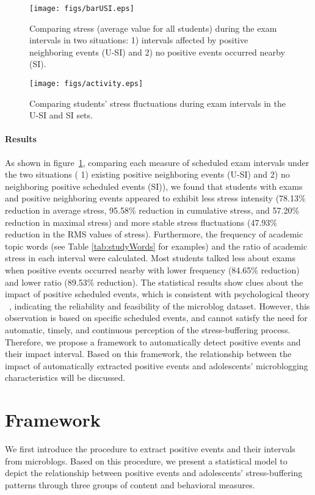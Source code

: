 \documentclass[5p,times,numbers,authoryear]{elsarticle}
\begin{document}
\begin{figure}[h]
\centering
\texttt{[image: figs/barUSI.eps]}
\caption{\small{Comparing stress (average value for all students) during the exam intervals in two situations:
1) intervals affected by positive neighboring events (U-SI) and 2) no positive events occurred nearby (SI).}}
\label{fig:frequencyBar}
\end{figure}

\begin{figure}[h]
\centering
\texttt{[image: figs/activity.eps]}
\caption{\small{Comparing students' stress fluctuations during exam intervals in the U-SI and SI sets. }}
\label{fig:frequency}
\end{figure}

\paragraph{Results}
As shown in figure~\ref{fig:frequencyBar}, comparing each measure of scheduled exam intervals under the two situations (
1) existing positive neighboring events (U-SI) and 2) no neighboring positive scheduled events (SI)), we found that students with exams and positive neighboring events appeared to exhibit less stress intensity (78.13\% reduction in average stress, 95.58\% reduction in cumulative stress, and 57.20\% reduction in maximal stress) and more stable stress fluctuations (47.93\% reduction in the RMS values of stress).
Furthermore, the frequency of academic topic words (see Table \ref{tab:studyWords} for examples) and the ratio of academic stress in each interval were calculated.
Most students talked less about exams when positive events occurred nearby
with lower frequency (84.65\% reduction) and lower ratio (89.53\% reduction).
The statistical results show clues about the impact of positive scheduled events,
which is consistent with psychological theory ~\citep{Cohen1984Positive, Cohen2010Positive, Needles1990Positive}, indicating the reliability and feasibility of the microblog dataset.
However, this observation is based on specific scheduled events,
and cannot satisfy the need for automatic, timely, and continuous perception of the stress-buffering process.
Therefore, we propose a framework to automatically detect positive events and their impact interval.
Based on this framework, the relationship between the impact of automatically extracted positive events and adolescents' microblogging characteristics will be discussed.


\section{Framework}
\label{sec:frame}
We first introduce the procedure to extract positive events and their intervals from microblogs.
Based on this procedure, we present a statistical model to depict the relationship between positive events and adolescents' stress-buffering patterns through three groups of content and behavioral measures.
\end{document}
